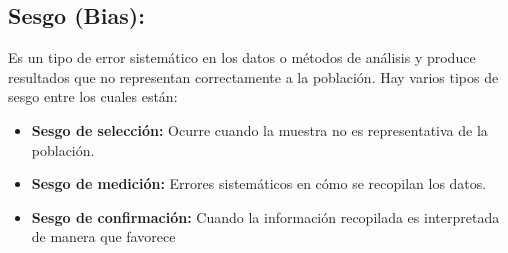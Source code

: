 \documentclass{report}
\begin{document}
\subsection{Sesgo (Bias):}
Es un tipo de error sistemático en los datos o métodos de análisis y produce resultados que no representan correctamente a la población. 
Hay varios tipos de sesgo entre los cuales están: 
\begin{itemize}
    \item\textbf{Sesgo de selección:} Ocurre cuando la muestra no es representativa de la población.
    \item\textbf{Sesgo de medición:} Errores sistemáticos en cómo se recopilan los datos.
    \item\textbf{Sesgo de confirmación:} Cuando la información recopilada es interpretada de manera que favorece
\end{itemize}
\end{document}
